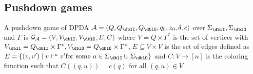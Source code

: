 %

\subsection{Pushdown games}

\begin{definition}
A {pushdown game} of DPDA $\calA = (Q, Q_\dblI, Q_\dblO, q_0, z_0, \delta, c)$ over $\Sigma_\dblI, \Sigma_\dblO$ and $\Gamma$ is $\calG_\calA = (V, V_\dblI, V_\dblO, E, C)$ where
$V = Q\times\Gamma^*$ is the set of vertices with $V_\dblI = Q_\dblI\times\Gamma^*, V_\dblO = Q_\dblO\times\Gamma^*$, $E\subseteq V\times V$ is the set of edges defined as $E = \{(v,v') \mid v \vdash^a v' \text{for some $a\in \Sigma_\dblI\cup\Sigma_\dblO$}\}$
and $C: V \to [n]$ is the coloring function such that
$C((q,u)) = c(q)$ for all $(q,u)\in V$.
\end{definition}

